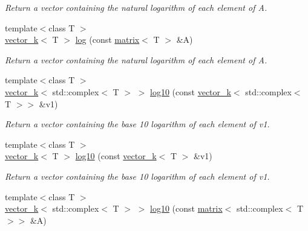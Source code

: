 \begin{DoxyCompactItemize}
\begin{DoxyCompactList}\small\item\em Return a vector containing the natural logarithm of each element of A. \end{DoxyCompactList}\item 
\hypertarget{namespacekeycpp_ab18fc1ec8072b5fdfd260346c66b2301}{{\footnotesize template$<$class T $>$ }\\\hyperlink{classkeycpp_1_1vector__k}{vector\-\_\-k}$<$ T $>$ \hyperlink{namespacekeycpp_ab18fc1ec8072b5fdfd260346c66b2301}{log} (const \hyperlink{classkeycpp_1_1matrix}{matrix}$<$ T $>$ \&A)}\label{namespacekeycpp_ab18fc1ec8072b5fdfd260346c66b2301}

\begin{DoxyCompactList}\small\item\em Return a vector containing the natural logarithm of each element of A. \end{DoxyCompactList}\item 
\hypertarget{namespacekeycpp_a9364d5d2e2a67359845a437550963985}{{\footnotesize template$<$class T $>$ }\\\hyperlink{classkeycpp_1_1vector__k}{vector\-\_\-k}$<$ std\-::complex$<$ T $>$ $>$ \hyperlink{namespacekeycpp_a9364d5d2e2a67359845a437550963985}{log10} (const \hyperlink{classkeycpp_1_1vector__k}{vector\-\_\-k}$<$ std\-::complex$<$ T $>$$>$ \&v1)}\label{namespacekeycpp_a9364d5d2e2a67359845a437550963985}

\begin{DoxyCompactList}\small\item\em Return a vector containing the base 10 logarithm of each element of v1. \end{DoxyCompactList}\item 
\hypertarget{namespacekeycpp_a506e11389a9ed0bfbd27f41a75df0719}{{\footnotesize template$<$class T $>$ }\\\hyperlink{classkeycpp_1_1vector__k}{vector\-\_\-k}$<$ T $>$ \hyperlink{namespacekeycpp_a506e11389a9ed0bfbd27f41a75df0719}{log10} (const \hyperlink{classkeycpp_1_1vector__k}{vector\-\_\-k}$<$ T $>$ \&v1)}\label{namespacekeycpp_a506e11389a9ed0bfbd27f41a75df0719}

\begin{DoxyCompactList}\small\item\em Return a vector containing the base 10 logarithm of each element of v1. \end{DoxyCompactList}\item 
\hypertarget{namespacekeycpp_a06e575bbcbc7b7f0f97f70348699c172}{{\footnotesize template$<$class T $>$ }\\\hyperlink{classkeycpp_1_1vector__k}{vector\-\_\-k}$<$ std\-::complex$<$ T $>$ $>$ \hyperlink{namespacekeycpp_a06e575bbcbc7b7f0f97f70348699c172}{log10} (const \hyperlink{classkeycpp_1_1matrix}{matrix}$<$ std\-::complex$<$ T $>$$>$ \&A)}\label{namespacekeycpp_a06e575bbcbc7b7f0f97f70348699c172}


\end{DoxyCompactItemize}
